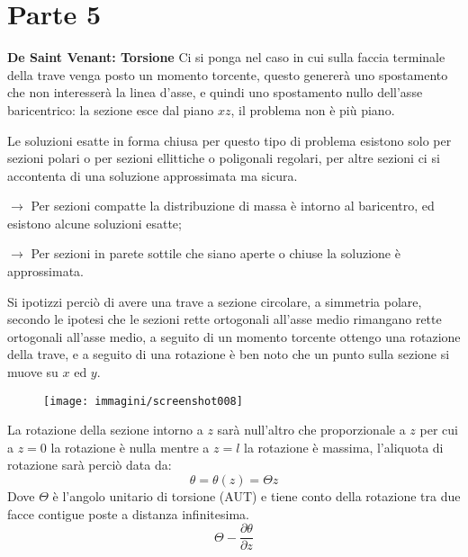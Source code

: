\documentclass{article}
\def\outcome{\textbf{Learning Outcomes:} Outcomes go here. }
\begin{document}
	\section*{Parte 5} %

\begin{adjustwidth}{2in}{} 
	
\textbf{{\Large De Saint Venant: Torsione}} \mbox{} \newline
		Ci si ponga nel caso in cui sulla faccia terminale della trave venga posto un momento torcente, questo genererà uno spostamento che non interesserà la linea d'asse, e quindi uno spostamento nullo dell'asse baricentrico: la sezione esce dal piano $xz$, il problema non è più piano. \newline 
		
		Le soluzioni esatte in forma chiusa per questo tipo di problema esistono solo per sezioni polari o per sezioni ellittiche o poligonali regolari, per altre sezioni ci si accontenta di una soluzione approssimata ma sicura. \newline 
		
		\item[$\rightarrow$] Per sezioni compatte la distribuzione di massa è intorno al baricentro, ed esistono alcune soluzioni esatte;
		\item[$\rightarrow$] Per sezioni in parete sottile che siano aperte o chiuse la soluzione è approssimata. 
		
		Si ipotizzi perciò di avere una trave a sezione circolare, a simmetria polare, secondo le ipotesi che le sezioni rette ortogonali all'asse medio rimangano rette ortogonali all'asse medio, a seguito di un momento torcente ottengo una rotazione della trave, e a seguito di una rotazione è ben noto che un punto sulla sezione si muove su $x$ ed $y$.
		
\begin{figure}[H]
	\centering
	\texttt{[image: immagini/screenshot008]}
	\label{fig:screenshot008}
\end{figure}

		La rotazione della sezione intorno a $z$ sarà null'altro che proporzionale a $z$ per cui a $z=0$ la rotazione è nulla mentre a $z=l$ la rotazione è massima, l'aliquota di rotazione sarà perciò data da: 
		\[ \theta = \theta(z)= \Theta z\]
		Dove $\Theta$ è l'angolo unitario di torsione (AUT) e tiene conto della rotazione tra due facce contigue poste a distanza infinitesima.
		\[\Theta - \dfrac{\partial \theta}{\partial z}\]
		

\end{adjustwidth}
\end{document}
